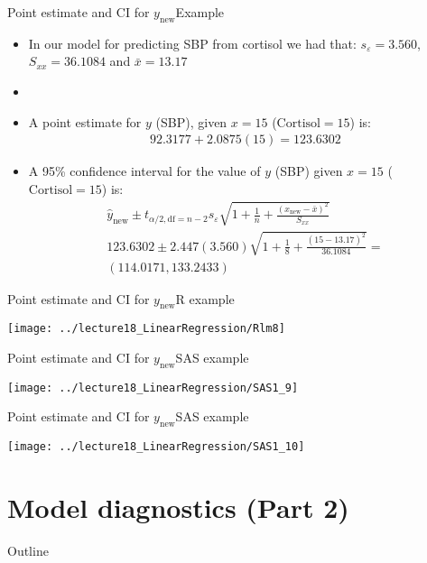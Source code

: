 \documentclass[xcolor=dvipsnames]{beamer}
\begin{document}
\begin{frame}{Point estimate and CI for $y_{\text{new}}$}{Example}
\begin{itemize}
		\item In our model for predicting SBP from cortisol we had that: $s_{\varepsilon} = 3.560$, $S_{xx} = 36.1084$ and $\bar{x}=13.17$
\item[]
\item A point estimate for $y$ (SBP), given $x=15$ ($\text{Cortisol}=15$) is:
\begin{gather*}
92.3177 + 2.0875(15) = 123.6302
\end{gather*}
\item A 95\% confidence interval for the value of $y$ (SBP) given $x=15$ ($\text{Cortisol}=15$) is:
	\begin{gather*}
	\hat{y}_{\text{new}} \pm t_{\alpha / 2, \text{df} = n-2}s_{\varepsilon}\sqrt{1+\frac{1}{n} + \frac{(x_{\text{new}}-\bar{x})^2}{S_{xx}}} \\
	123.6302 \pm 2.447 (3.560)\sqrt{1+ \frac{1}{8} + \frac{(15-13.17)^2}{36.1084}} = \\
	(114.0171, 133.2433)
	\end{gather*}
\end{itemize}
\end{frame}

\begin{frame}{Point estimate and CI for $y_{\text{new}}$}{R example}
	\begin{center}
		\texttt{[image: ../lecture18\_LinearRegression/Rlm8]}
	\end{center}
\end{frame}

\begin{frame}{Point estimate and CI for $y_{\text{new}}$}{SAS example}
	\begin{center}
		\texttt{[image: ../lecture18\_LinearRegression/SAS1\_9]}
	\end{center}
\end{frame}

\begin{frame}{Point estimate and CI for $y_{\text{new}}$}{SAS example}
	\begin{center}
		\texttt{[image: ../lecture18\_LinearRegression/SAS1\_10]}
	\end{center}
\end{frame}


\section{Model diagnostics (Part 2)}
\begin{frame}{Outline}
\tableofcontents[currentsection,subsectionstyle=show/shaded/hide]
\end{frame}
\end{document}
